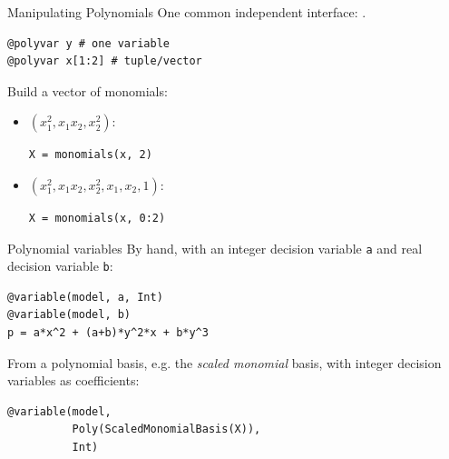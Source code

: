 \documentclass[final]{beamer}
\newlength{\onecolwid}
\begin{document}
\begin{frame}[t,fragile]
\begin{columns}[t]
\begin{column}{\onecolwid}
\begin{block}{Manipulating Polynomials}
    One common independent interface: .
\begin{verbatim}
@polyvar y # one variable
@polyvar x[1:2] # tuple/vector
\end{verbatim}
    Build a vector of monomials:

    \begin{itemize}
      \item
        $(x_1^2, x_1x_2, x_2^2)$:
\begin{verbatim}
X = monomials(x, 2)
\end{verbatim}
      \item
        $(x_1^2, x_1x_2, x_2^2, x_1, x_2, 1)$:
\begin{verbatim}
X = monomials(x, 0:2)
\end{verbatim}
    \end{itemize}
  \end{block}

  \begin{block}{Polynomial variables}
    By hand, with an integer decision variable \texttt{a} and real decision variable \texttt{b}:
\begin{verbatim}
@variable(model, a, Int)
@variable(model, b)
p = a*x^2 + (a+b)*y^2*x + b*y^3
\end{verbatim}
    From a polynomial basis, e.g. the
    \emph{scaled monomial} basis,
    with integer decision variables as coefficients:
\begin{verbatim}
@variable(model,
          Poly(ScaledMonomialBasis(X)),
          Int)
\end{verbatim}
  \end{block}


\end{column}
\end{columns}
\end{frame}
\end{document}

